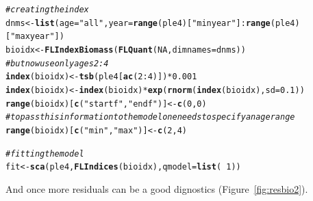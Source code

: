 \documentclass[a4paper,english,10pt]{article}\usepackage[]{graphicx}\usepackage[]{color}
\makeatletter
\newcommand{\hlnum}[1]{\textcolor[rgb]{0.686,0.059,0.569}{#1}}%
\newcommand{\hlstr}[1]{\textcolor[rgb]{0.192,0.494,0.8}{#1}}%
\newcommand{\hlcom}[1]{\textcolor[rgb]{0.678,0.584,0.686}{\textit{#1}}}%
\newcommand{\hlopt}[1]{\textcolor[rgb]{0,0,0}{#1}}%
\newcommand{\hlstd}[1]{\textcolor[rgb]{0.345,0.345,0.345}{#1}}%
\newcommand{\hlkwb}[1]{\textcolor[rgb]{0.69,0.353,0.396}{#1}}%
\newcommand{\hlkwc}[1]{\textcolor[rgb]{0.333,0.667,0.333}{#1}}%
\newcommand{\hlkwd}[1]{\textcolor[rgb]{0.737,0.353,0.396}{\textbf{#1}}}%
\newenvironment{kframe}{%
 \def\at@end@of@kframe{}%
 \ifinner\ifhmode%
  \def\at@end@of@kframe{\end{minipage}}%
  \begin{minipage}{\columnwidth}%
 \fi\fi%
 \def\FrameCommand##1{\hskip\@totalleftmargin \hskip-\fboxsep
 \colorbox{shadecolor}{##1}\hskip-\fboxsep
     \hskip-\linewidth \hskip-\@totalleftmargin \hskip\columnwidth}%
 \MakeFramed {\advance\hsize-\width
   \@totalleftmargin\z@ \linewidth\hsize
   \@setminipage}}%
 {\par\unskip\endMakeFramed%
 \at@end@of@kframe}
\newenvironment{knitrout}{}{} %
\makeatother
\begin{document}
\begin{knitrout}
\color{fgcolor}\begin{kframe}
\begin{alltt}
\hlcom{# creating the index}
\hlstd{dnms} \hlkwb{<-} \hlkwd{list}\hlstd{(}\hlkwc{age} \hlstd{=} \hlstr{"all"}\hlstd{,} \hlkwc{year} \hlstd{=} \hlkwd{range}\hlstd{(ple4)[}\hlstr{"minyear"}\hlstd{]}\hlopt{:}\hlkwd{range}\hlstd{(ple4)[}\hlstr{"maxyear"}\hlstd{])}
\hlstd{bioidx} \hlkwb{<-} \hlkwd{FLIndexBiomass}\hlstd{(}\hlkwd{FLQuant}\hlstd{(}\hlnum{NA}\hlstd{,} \hlkwc{dimnames} \hlstd{= dnms))}
\hlcom{# but now use only ages 2:4}
\hlkwd{index}\hlstd{(bioidx)} \hlkwb{<-} \hlkwd{tsb}\hlstd{(ple4[}\hlkwd{ac}\hlstd{(}\hlnum{2}\hlopt{:}\hlnum{4}\hlstd{)])} \hlopt{*} \hlnum{0.001}
\hlkwd{index}\hlstd{(bioidx)} \hlkwb{<-} \hlkwd{index}\hlstd{(bioidx)} \hlopt{*} \hlkwd{exp}\hlstd{(}\hlkwd{rnorm}\hlstd{(}\hlkwd{index}\hlstd{(bioidx),} \hlkwc{sd} \hlstd{=} \hlnum{0.1}\hlstd{))}
\hlkwd{range}\hlstd{(bioidx)[}\hlkwd{c}\hlstd{(}\hlstr{"startf"}\hlstd{,} \hlstr{"endf"}\hlstd{)]} \hlkwb{<-} \hlkwd{c}\hlstd{(}\hlnum{0}\hlstd{,} \hlnum{0}\hlstd{)}
\hlcom{# to pass this information to the model one needs to specify an age range}
\hlkwd{range}\hlstd{(bioidx)[}\hlkwd{c}\hlstd{(}\hlstr{"min"}\hlstd{,} \hlstr{"max"}\hlstd{)]} \hlkwb{<-} \hlkwd{c}\hlstd{(}\hlnum{2}\hlstd{,} \hlnum{4}\hlstd{)}

\hlcom{# fitting the model}
\hlstd{fit} \hlkwb{<-} \hlkwd{sca}\hlstd{(ple4,} \hlkwd{FLIndices}\hlstd{(bioidx),} \hlkwc{qmodel} \hlstd{=} \hlkwd{list}\hlstd{(}\hlopt{~}\hlnum{1}\hlstd{))}
\end{alltt}
\end{kframe}
\end{knitrout}

And once more residuals can be a good dignostics (Figure~\ref{fig:resbio2}).
\end{document}
